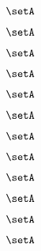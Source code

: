 \begin{forslides}
    \begin{equation}
        \label{eq:slides-translation-149}
        \setA
    \end{equation}
    
    \begin{equation}
        \label{eq:slides-translation-150}
        \setA
    \end{equation}

    \begin{equation}
        \label{eq:slides-translation-151}
        \setA
    \end{equation}

    \begin{equation}
        \label{eq:slides-translation-152}
        \setA
    \end{equation}

    \begin{equation}
        \label{eq:slides-translation-153}
        \setA
    \end{equation}

    \begin{equation}
        \label{eq:slides-translation-154}
        \setA
    \end{equation}

    \begin{equation}
        \label{eq:slides-translation-155}
        \setA
    \end{equation}

    \begin{equation}
        \label{eq:slides-translation-156}
        \setA
    \end{equation}

    \begin{equation}
        \label{eq:slides-translation-157}
        \setA
    \end{equation}

    \begin{equation}
        \label{eq:slides-translation-158}
        \setA
    \end{equation}

    \begin{equation}
        \label{eq:slides-translation-159}
        \setA
    \end{equation}
    
    \begin{equation}
        \label{eq:slides-translation-160}
        \setA
    \end{equation}


\end{forslides}
